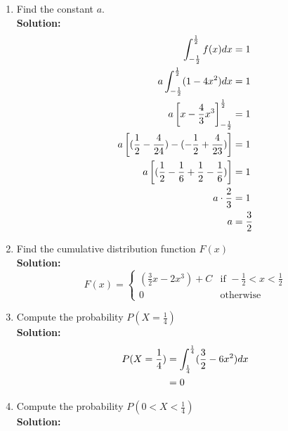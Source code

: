 \documentclass[a4paper]{article}
\begin{document}
\begin{enumerate}
\begin{enumerate}
	\item Find the constant $a$.\\
	\textbf{Solution:}\\
	
\begin{align}
	\int_{-\frac{1}{2}}^{\frac{1}{2}}f(x)dx &= 1\notag\\
	a \int_{-\frac{1}{2}}^{\frac{1}{2}} (1 - 4x^2)dx &= 1\notag\\
	a \left[ x - \frac{4}{3}x^3\right]_{-\frac{1}{2}}^\frac{1}{2} &= 1\notag\\
	a \left[ (\frac{1}{2} - \frac{4}{24}) - (- \frac{1}{2} + \frac{4}{23})\right] &= 1\notag\\
	a \left[ (\frac{1}{2} - \frac{1}{6} + \frac{1}{2} - \frac{1}{6})\right] &= 1\notag\\
	a \cdot \frac{2}{3} &= 1\notag\\
	a &= \frac{3}{2}\notag
\end{align}		
		
		
		
	
	\item Find the cumulative distribution function $F(x)$\\
	\textbf{Solution:}\\

\[
 F(x) = 
  \begin{cases} 
    (\frac{3}{2}x - 2x^3) + C & \text{if } -\frac{1}{2} < x < \frac{1}{2}\\
   0 & \text{otherwise}
  \end{cases}
\]
\vspace{1em}

	

	\item Compute the probability $P(X = \frac{1}{4})$\\
	\textbf{Solution:}\\

\begin{align}
	P(X = \frac{1}{4}) &= \int_\frac{1}{4}^\frac{1}{4} (\frac{3}{2} - 6x^2)dx\notag\\
	&= 0\notag
\end{align}
\vspace{1em}




	\item Compute the probability $P(0 < X < \frac{1}{4})$\\
	\textbf{Solution:}\\
	

\end{enumerate}
\end{enumerate}
\end{document}
